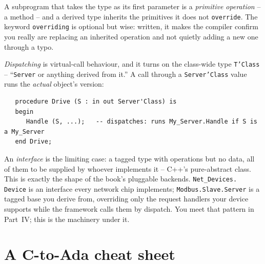 A subprogram that takes the type as its first parameter is a \emph{primitive
operation} -- a method -- and a derived type inherits the primitives it does not
\texttt{override}. The keyword \texttt{overriding} is optional but wise: written, it
makes the compiler confirm you really are replacing an inherited operation and not
quietly adding a new one through a typo.

\emph{Dispatching} is virtual-call behaviour, and it turns on the class-wide type
\texttt{T'Class} -- ``\texttt{Server} or anything derived from it.'' A call through a
\texttt{Server'Class} value runs the \emph{actual} object's version:

\begin{lstlisting}
   procedure Drive (S : in out Server'Class) is
   begin
      Handle (S, ...);   -- dispatches: runs My_Server.Handle if S is a My_Server
   end Drive;
\end{lstlisting}

An \emph{interface} is the limiting case: a tagged type with operations but no data,
all of them to be supplied by whoever implements it -- C++'s pure-abstract class.
This is exactly the shape of the book's pluggable backends. \texttt{Net\_Devices.%
Device} is an interface every network chip implements; \texttt{Modbus.Slave.Server}
is a tagged base you derive from, overriding only the request handlers your device
supports while the framework calls them by dispatch. You meet that pattern in
Part~IV; this is the machinery under it.

\section{A C-to-Ada cheat sheet}

